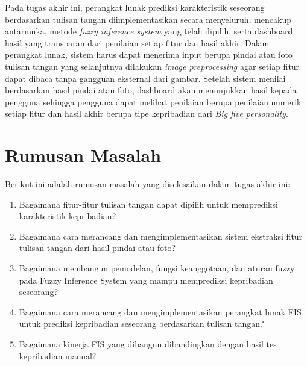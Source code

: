\documentclass[a4paper,twoside]{article}
\begin{document}
	Pada tugas akhir ini, perangkat lunak prediksi karakteristik seseorang berdasarkan tulisan tangan diimplementasikan secara menyeluruh, mencakup antarmuka, metode \textit{fuzzy inference system}
	yang telah dipilih, serta dashboard hasil yang transparan dari penilaian setiap fitur dan hasil akhir. Dalam perangkat lunak, sistem harus dapat menerima input berupa pindai atau foto
	tulisan tangan yang selanjutnya dilakukan \textit{image preprocessing} agar setiap fitur dapat dibaca tanpa gangguan eksternal dari gambar. Setelah sistem menilai berdasarkan 
	hasil pindai atau foto, dashboard akan menunjukkan hasil kepada pengguna sehingga pengguna dapat melihat penilaian berupa penilaian numerik setiap fitur dan hasil akhir berupa tipe kepribadian
	dari \textit{Big five personality}.

	\section{Rumusan Masalah}
	Berikut ini adalah rumusan masalah yang diselesaikan dalam tugas akhir ini:
	\begin{enumerate}
		\item Bagaimana fitur-fitur tulisan tangan dapat dipilih untuk memprediksi karakteristik kepribadian?
		\item Bagaimana cara merancang dan mengimplementasikan sistem ekstraksi fitur tulisan tangan dari hasil pindai atau foto?
		\item Bagaimana membangun pemodelan, fungsi keanggotaan, dan aturan fuzzy pada Fuzzy Inference System yang mampu memprediksi kepribadian seseorang?
		\item Bagaimana cara merancang dan mengimplementasikan perangkat lunak FIS untuk prediksi kepribadian seseorang berdasarkan tulisan tangan?
		\item Bagaimana kinerja FIS yang dibangun dibandingkan dengan hasil tes kepribadian manual?
	\end{enumerate}
\end{document}
